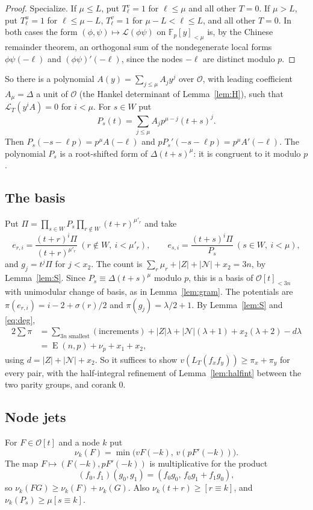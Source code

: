 \documentclass[11pt]{amsart}
\theoremstyle{definition}
\theoremstyle{remark}
\numberwithin{equation}{section}
\newcommand{\F}{\mathbb F}
\newcommand{\cL}{\mathcal L}
\newcommand{\cO}{\mathcal O}
\newcommand{\Lex}{\operatorname{E}}
\begin{document}
\begin{proof}
Specialize. If $\mu\le L$, put $T^v_\ell=1$ for $\ell\le\mu$ and all other $T=0$. If $\mu>L$, put $T^u_\ell=1$ for
$\ell\le\mu-L$, $T^v_\ell=1$ for $\mu-L<\ell\le L$, and all other $T=0$. In both cases the form
$(\phi,\psi)\mapsto\cL(\phi\psi)$ on $\F_p[y]_{<\mu}$ is, by the Chinese remainder theorem, an orthogonal sum of the
nondegenerate local forms $\phi\psi(-\ell)$ and $(\phi\psi)'(-\ell)$, since the nodes $-\ell$ are distinct modulo $p$.
\end{proof}

So there is a polynomial $A(y)=\sum_{j\le\mu}A_jy^j$ over $\cO$, with leading coefficient $A_\mu=\Delta$ a unit of $\cO$
(the Hankel determinant of Lemma~\ref{lem:H}), such that $\cL_T(y^iA)=0$ for $i<\mu$. For $s\in W$ put
\[
 P_s(t)=\sum_{j\le\mu}A_jp^{\mu-j}(t+s)^j .
\]
Then $P_s(-s-\ell p)=p^\mu A(-\ell)$ and $pP_s'(-s-\ell p)=p^\mu A'(-\ell)$. The polynomial $P_s$ is a root-shifted
form of $\Delta(t+s)^\mu$: it is congruent to it modulo $p$.

\subsection{The basis}
Put $\Pi=\prod_{s\in W}P_s\prod_{r\notin W}(t+r)^{\mu'_r}$ and take
\[
 e_{r,i}=\frac{(t+r)^i\Pi}{(t+r)^{\mu'_r}}\ (r\notin W,\ i<\mu'_r),\qquad e_{s,i}=\frac{(t+s)^i\Pi}{P_s}\ (s\in W,\ i<\mu),
\]
and $g_j=t^j\Pi$ for $j<x_2$.
The count is $\sum_r\mu_r+|Z|+|\mathcal N|+x_2=3n$, by Lemma~\ref{lem:S}. Since $P_s\equiv\Delta(t+s)^\mu$ modulo $p$,
this is a basis of $\cO[t]_{<3n}$ with unimodular change of basis, as in Lemma~\ref{lem:gram}. The potentials are
$\pi(e_{r,i})=i-2+\sigma(r)/2$ and $\pi(g_j)=\lambda/2+1$. By Lemma~\ref{lem:S} and \eqref{eq:deg},
\begin{align*}
 2\sum\pi&=\sum_{\text{$3n$ smallest}}(\text{increments})+|Z|\lambda+|\mathcal N|(\lambda+1)+x_2(\lambda+2)-d\lambda\\
 &=\Lex(n,p)+\nu_p+x_1+x_2,
\end{align*}
using $d=|Z|+|\mathcal N|+x_2$. So it suffices to show $v(L_T(f_xf_y))\ge\pi_x+\pi_y$ for every pair, with the
half-integral refinement of Lemma~\ref{lem:halfint} between the two parity groups, and corank $0$.

\subsection{Node jets}
For $F\in\cO[t]$ and a node $k$ put
\[
 \nu_k(F)=\min\bigl(v F(-k),\,v(pF'(-k))\bigr).
\]
The map
$F\mapsto(F(-k),pF'(-k))$ is multiplicative for the product
\[
 (f_0,f_1)(g_0,g_1)=(f_0g_0,\,f_0g_1+f_1g_0),
\]
so
$\nu_k(FG)\ge\nu_k(F)+\nu_k(G)$. Also $\nu_k(t+r)\ge[r\equiv k]$, and $\nu_k(P_s)\ge\mu[s\equiv k]$.
\end{document}
